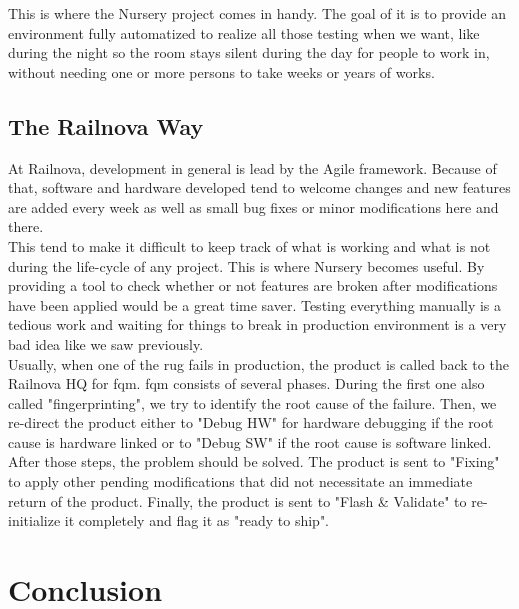 \documentclass[12pt]{article}
\theoremstyle{definition}
\theoremstyle{definition}
\theoremstyle{remark}
\begin{document}
This is where the Nursery project comes in handy. The goal of it is to provide an environment fully automatized to realize all those testing when we want, like during the night so the room stays silent during the day for people to work in, without needing one or more persons to take weeks or years of works.


\subsection{The Railnova Way}

At Railnova, development in general is lead by the Agile framework. Because of that, software and hardware developed tend to welcome changes and new features are added every week as well as small bug fixes or minor modifications here and there.\\

This tend to make it difficult to keep track of what is working and what is not during the life-cycle of any project. This is where Nursery becomes useful. By providing a tool to check whether or not features are broken after modifications have been applied would be a great time saver. Testing everything manually is a tedious work and waiting for things to break in production environment is a very bad idea like we saw previously.\\

Usually, when one of the \gls{rug} fails in production, the product is called back to the Railnova HQ for \gls{fqm}. \gls{fqm} consists of several phases. During the first one also called "fingerprinting", we try to identify the root cause of the failure. Then, we re-direct the product either to "Debug HW" for hardware debugging if the root cause is hardware linked or to "Debug SW" if the root cause is software linked. After those steps, the problem should be solved. The product is sent to "Fixing" to apply other pending modifications that did not necessitate an immediate return of the product. Finally, the product is sent to "Flash \& Validate" to re-initialize it completely and flag it as "ready to ship".\\



\section{Conclusion}
\end{document}
